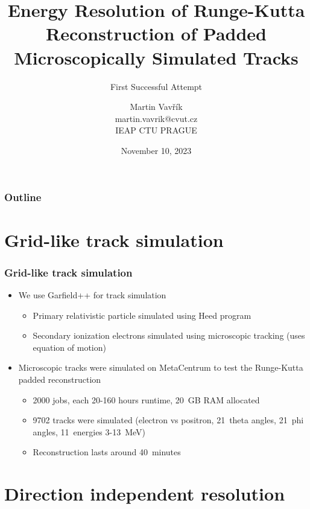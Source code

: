 \documentclass{beamer}
\title[Runge-Kutta Algorithm Energy Resolution]{Energy Resolution of Runge-Kutta Reconstruction of Padded Microscopically Simulated Tracks}
\subtitle{First Successful Attempt}
\author[M.~Vavřík]{\foreignlanguage{czech}{Martin Vavřík}\vspace{0.5cm}\\martin.vavrik@cvut.cz\\IEAP CTU PRAGUE\\}
\date{November 10, 2023}
\begin{document}
	
	\begin{frame}
		\titlepage
	\end{frame}
	
	\begin{frame}
		\frametitle{Outline}
		\tableofcontents
	\end{frame}
	
	\section{Grid-like track simulation}
		\begin{frame}
			\frametitle{Grid-like track simulation}
			\begin{itemize}
				\item We use Garfield++ for track simulation
				\begin{itemize}
					\item Primary relativistic particle simulated using Heed program~\cite{heed}
					\item Secondary ionization electrons simulated using microscopic tracking (uses equation of motion)
				\end{itemize}
				\item Microscopic tracks were simulated on MetaCentrum to test the Runge-Kutta padded reconstruction
				\begin{itemize}
					\item 2000 jobs, each 20-160 hours runtime, 20~GB RAM allocated
					\item 9702 tracks were simulated (electron vs positron, 21~theta angles, 21~phi angles, 11~energies 3-13~MeV)
					\item Reconstruction lasts around 40~minutes
				\end{itemize}
			\end{itemize}
		\end{frame}
	
	\section{Direction independent resolution}
	
\end{document}
